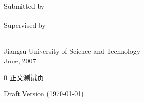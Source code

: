 \documentclass[UTF8]{ctexbook}
\begin{document}
{%
\begin{center}
\linespread{1.5}
\heiti
{}
Submitted by\\
\theAunameEn\\
Supervised by\\
\theSunameEn\\
\end{center}
\vspace{120pt}
}
{%
\begin{center}
\linespread{1.5}
\songti
{}
Jiangsu University of Science and Technology\\
June, 2007\\
\end{center}
}
\clearpage
\setcounter{page} {0}
正文测试页
\clearpage
  \if@twoside
    \thispagestyle{empty}
    \cleardoublepage
  \else
      \thispagestyle{empty}
      \begin{footnotesize}
        \noindent
        Draft Version (\today)
      \end{footnotesize}
  \fi
\end{document}
